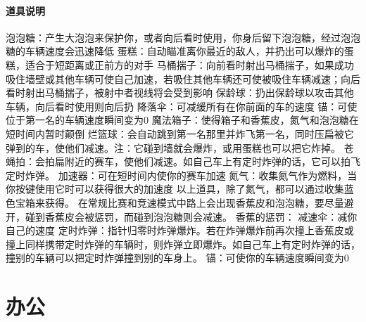 \documentclass[paper=a4,fontsize=11pt]{article}
\begin{document}
	\subsection{道具说明}
	
	\noindent 泡泡糖：产生大泡泡来保护你，或者向后看时使用，你身后留下泡泡糖，经过泡泡糖的车辆速度会迅速降低\newline
	蛋糕：自动瞄准离你最近的敌人，并扔出可以爆炸的蛋糕，适合于短距离或正前方的对手\newline
	马桶揣子：向前看时射出马桶揣子，如果成功吸住墙壁或其他车辆可使自己加速，若吸住其他车辆还可使被吸住车辆减速；向后看时射出马桶揣子，被射中者视线将会受到影响\newline
	保龄球：扔出保龄球以攻击其他车辆，向后看时使用则向后扔\newline
	降落伞：可减缓所有在你前面的车的速度\newline
	锚：可使位于第一名的车辆速度瞬间变为0\newline
	魔法箱子：使得箱子和香蕉皮，氮气和泡泡糖在短时间内暂时颠倒\newline
	烂篮球：会自动跳到第一名那里并炸飞第一名，同时压扁被它弹到的车，使他们减速。注：它碰到墙就会爆炸，或用蛋糕也可以把它炸掉。\newline
	苍蝇拍：会拍扁附近的赛车，使他们减速。如自己车上有定时炸弹的话，它可以拍飞定时炸弹。\newline
	加速器：可在短时间内使你的赛车加速\newline
	氮气：收集氮气作为燃料，当你按键使用它时可以获得很大的加速度\newline
	以上道具，除了氮气，都可以通过收集蓝色宝箱来获得。\newline
	在常规比赛和竞速模式中路上会出现香蕉皮和泡泡糖，要尽量避开，碰到香蕉皮会被惩罚，而碰到泡泡糖则会减速。\newline
	香蕉的惩罚：\newline
	减速伞：减你自己的速度\newline
	定时炸弹：指针归零时炸弹爆炸。若在炸弹爆炸前再次撞上香蕉皮或撞上同样携带定时炸弹的车辆时，则炸弹立即爆炸。如自己车上有定时炸弹的话，撞别的车辆可以把定时炸弹撞到别的车身上。\newline
	锚：可使你的车辆速度瞬间变为0
	
	\clearpage
		
	\part{办公}
	
	\clearpage
	
\end{document}
